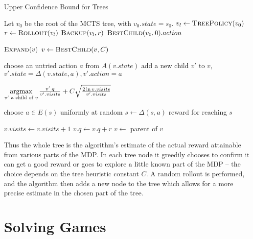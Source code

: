 \begin{algorithm}
    \caption{Upper Confidence Bound for Trees}
\label{alg:uct}
\begin{algorithmic}[1]
    \State Let $v_0$ be the root of the MCTS tree, with $v_0.state = s_0$.
        \State $v_l \gets \Call{TreePolicy}{v_0}$
        \State $r \gets \Call{Rollout}{v_l}$
        \State $\Call{Backup}{v_l, r}$
    \EndWhile
    \State \Return $\Call{BestChild}{v_0, 0}.action$
\EndFunction

            \State $\Call{Expand}{v}$
        \Else
            \State $v \gets \Call{BestChild}{v, C}$
        \EndIf
    \EndWhile
\EndFunction

    \State choose an untried action $a$ from $A(v.state)$
    \State add a new child $v'$ to $v$,
        $v'.state = \Delta(v.state, a),
        v'.action = a$
\EndFunction

    \State \Return
    $\operatorname*{\arg\!\max}\limits_{v' \text{ a child of } v}
    \frac{v'.q}{v'.visits} +
    C \sqrt{\frac{2\ln v.visits}{v'.visits}}$
\EndFunction

        \State choose $a \in E(s)$ uniformly at random
        \State $s \gets \Delta(s,a)$
    \EndWhile
    \Return reward for reaching $s$
\EndFunction

        \State $v.visits \gets v.visits + 1$
        \State $v.q \gets v.q + r$
        \State $v \gets$ parent of $v$
    \EndWhile
\EndFunction
\end{algorithmic}
\end{algorithm}

Thus the whole tree is the algorithm's estimate of the actual reward attainable
from various parts of the MDP. In each tree node
it greedily chooses to confirm it can get a good reward or goes to explore
a little known part of the MDP -- the choice depends on the tree heuristic
constant $C$.
A random rollout is performed, and the algorithm then adds a new node to
the tree which allows for a more precise estimate in the chosen part of
the tree.


\section{Solving Games}

